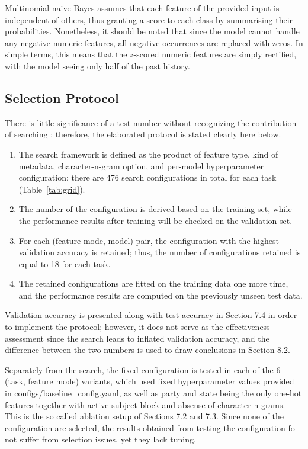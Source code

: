 \documentclass[10pt,twocolumn,twoside,a4paper]{article}
\begin{document}
Multinomial naive Bayes \cite{mccallum1998comparison} assumes that each feature of the provided input is independent of others, thus granting a score to each class by summarising their probabilities. Nonetheless, it should be noted that since the model cannot handle any negative numeric features, all negative occurrences are replaced with zeros. In simple terms, this means that the $z$-scored numeric features are simply rectified, with the model seeing only half of the past history.

\subsection{Selection Protocol}

There is little significance of a test number without recognizing the contribution of searching \cite{dodge2019show}; therefore, the elaborated protocol is stated clearly here below.

\begin{enumerate}
\item The search framework is defined as the product of feature type, kind of metadata, character-n-gram option, and per-model hyperparameter configuration: there are 476 search configurations in total for each task (Table~\ref{tab:grid}).
\item The number of the configuration is derived based on the training set, while the performance results after training will be checked on the validation set.
\item For each (feature mode, model) pair, the configuration with the highest validation accuracy is retained; thus, the number of configurations retained is equal to 18 for each task.
\item The retained configurations are fitted on the training data one more time, and the performance results are computed on the previously unseen test data.
\end{enumerate}

Validation accuracy is presented along with test accuracy in Section 7.4 in order to implement the protocol; however, it does not serve as the effectiveness assessment since the search leads to inflated validation accuracy, and the difference between the two numbers is used to draw conclusions in Section 8.2.

Separately from the search, the fixed configuration is tested in each of the 6 (task, feature mode) variants, which used fixed hyperparameter values provided in configs/baseline\_config.yaml, as well as party and state being the only one-hot features together with active subject block and absense of character n-grams. This is the so called ablation setup of Sections 7.2 and 7.3. Since none of the configuration are selected, the results obtained from testing the configuration fo not suffer from selection issues, yet they lack tuning.
\end{document}
